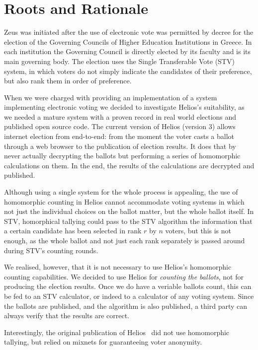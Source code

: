 \documentclass[runningheads,a4paper]{llncs}
\begin{document}
\section{Roots and Rationale}

Zeus was initiated after the use of electronic vote was permitted by
decree for the election of the Governing Councils of Higher Education
Institutions in Greece. In each institution the Governing Council is
directly elected by its faculty and is its main governing body. The
election uses the Single Transferable Vote (STV) system, in which
voters do not simply indicate the candidates of their preference, but
also rank them in order of preference. 

When we were charged with providing an implementation of a system
implementing electronic voting we decided to investigate Helios's
suitability, as we needed a mature system with a proven record in real
world elections and published open source code. The current version of
Helios (version 3) allows internet election from end-to-end: from the
moment the voter casts a ballot through a web browser to the
publication of election results. It does that by never actually
decrypting the ballots but performing a series of homomorphic
calculations on them. In the end, the results of the calculations are
decrypted and published. 

Although using a single system for the whole process is appealing, the
use of homomorphic counting in Helios cannot accommodate voting
systems in which not just the individual choices on the ballot matter,
but the whole ballot itself. In STV, homorphical tallying could pass
to the STV algorithm the information that a certain candidate has been
selected in rank $r$ by $n$ voters, but this is not enough, as the whole
ballot and not just each rank separately is passed around during STV's
counting rounds.

We realised, however, that it is not necessary to use Helios's
homomorphic counting capabilities. We decided to use Helios for
\emph{counting the ballots}, not for producing the election results.
Once we do have a veriable ballots count, this can be fed to an STV
calculator, or indeed to a calculator of any voting system. Since the
ballots are published, and the algorithm is also published, a third
party can always verify that the results are correct.

Interestingly, the original publication of Helios~\cite{adida:2008}
did not use homomorphic tallying, but relied on mixnets for
guaranteeing voter anonymity. 
\end{document}
